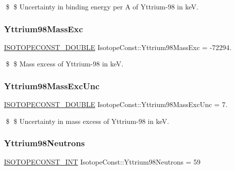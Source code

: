 \$ \$ Uncertainty in binding energy per A of Yttrium-\/98 in keV. \mbox{\label{group___isotope_const-_yttrium-_y98_ga586e581f2265a0de47999a995ea78c90}} 
\subsubsection{\texorpdfstring{Yttrium98\+Mass\+Exc}{Yttrium98MassExc}}
{\footnotesize\ttfamily \mbox{\hyperlink{group___isotope_const-_macros_ga8f45a7272ce02c0b4c65c44636ed719a}{I\+S\+O\+T\+O\+P\+E\+C\+O\+N\+S\+T\+\_\+\+D\+O\+U\+B\+LE}} Isotope\+Const\+::\+Yttrium98\+Mass\+Exc = -\/72294.}

\$ \$ Mass excess of Yttrium-\/98 in keV. \mbox{\label{group___isotope_const-_yttrium-_y98_ga541e0596717afd28a29a821c348d3864}} 
\subsubsection{\texorpdfstring{Yttrium98\+Mass\+Exc\+Unc}{Yttrium98MassExcUnc}}
{\footnotesize\ttfamily \mbox{\hyperlink{group___isotope_const-_macros_ga8f45a7272ce02c0b4c65c44636ed719a}{I\+S\+O\+T\+O\+P\+E\+C\+O\+N\+S\+T\+\_\+\+D\+O\+U\+B\+LE}} Isotope\+Const\+::\+Yttrium98\+Mass\+Exc\+Unc = 7.}

\$ \$ Uncertainty in mass excess of Yttrium-\/98 in keV. \mbox{\label{group___isotope_const-_yttrium-_y98_gac69b25a47e5a6ff26b00bd70472d3a89}} 
\subsubsection{\texorpdfstring{Yttrium98\+Neutrons}{Yttrium98Neutrons}}
{\footnotesize\ttfamily \mbox{\hyperlink{group___isotope_const-_macros_ga5f18360b3e99483a35c32d789e62621c}{I\+S\+O\+T\+O\+P\+E\+C\+O\+N\+S\+T\+\_\+\+I\+NT}} Isotope\+Const\+::\+Yttrium98\+Neutrons = 59}

